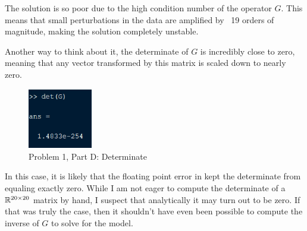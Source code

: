 The solution is so poor due to the high condition number of the operator $G$. This means that small perturbations in the data are amplified by ~19 orders of magnitude, making the solution completely unstable. 

Another way to think about it, the determinate of $G$ is incredibly close to zero, meaning that any vector transformed by this matrix is scaled down to nearly zero. 

\begin{figure}[h] \label{fig: prob 1 part d}
	\centering
	\includegraphics[width=0.25\textwidth]{./images/prob1_partd.png}
	\caption{Problem 1, Part D: Determinate}
\end{figure}
\FloatBarrier

In this case, it is likely that the floating point error in \MATLAB kept the determinate from equaling exactly zero. While I am not eager to compute the determinate of a $\mathbb{R}^{20 \times 20}$ matrix by hand, I suspect that analytically it may turn out to be zero. If that was truly the case, then it shouldn't have even been possible to compute the inverse of $G$ to solve for the model.


